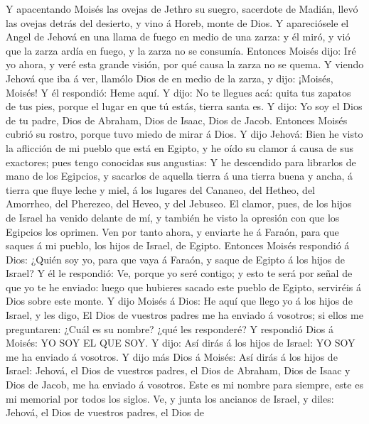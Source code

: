  Y apacentando Moisés las ovejas de Jethro su suegro,
sacerdote de Madián, llevó las ovejas detrás del desierto, y vino á
Horeb, monte de Dios.  Y apareciósele el Angel de Jehová
en una llama de fuego en medio de una zarza: y él miró, y vió que la
zarza ardía en fuego, y la zarza no se consumía.  Entonces
Moisés dijo: Iré yo ahora, y veré esta grande visión, por qué causa la
zarza no se quema.  Y viendo Jehová que iba á ver, llamólo
Dios de en medio de la zarza, y dijo: ¡Moisés, Moisés! Y él respondió:
Heme aquí.  Y dijo: No te llegues acá: quita tus zapatos
de tus pies, porque el lugar en que tú estás, tierra santa es.
 Y dijo: Yo soy el Dios de tu padre, Dios de Abraham, Dios
de Isaac, Dios de Jacob. Entonces Moisés cubrió su rostro, porque tuvo
miedo de mirar á Dios.  Y dijo Jehová: Bien he visto la
aflicción de mi pueblo que está en Egipto, y he oído su clamor á causa
de sus exactores; pues tengo conocidas sus angustias:  Y
he descendido para librarlos de mano de los Egipcios, y sacarlos de
aquella tierra á una tierra buena y ancha, á tierra que fluye leche y
miel, á los lugares del Cananeo, del Hetheo, del Amorrheo, del Pherezeo,
del Heveo, y del Jebuseo.  El clamor, pues, de los hijos
de Israel ha venido delante de mí, y también he visto la opresión con
que los Egipcios los oprimen.  Ven por tanto ahora, y
enviarte he á Faraón, para que saques á mi pueblo, los hijos de Israel,
de Egipto.  Entonces Moisés respondió á Dios: ¿Quién soy
yo, para que vaya á Faraón, y saque de Egipto á los hijos de Israel?
 Y él le respondió: Ve, porque yo seré contigo; y esto te
será por señal de que yo te he enviado: luego que hubieres sacado este
pueblo de Egipto, serviréis á Dios sobre este monte.  Y
dijo Moisés á Dios: He aquí que llego yo á los hijos de Israel, y les
digo, El Dios de vuestros padres me ha enviado á vosotros; si ellos me
preguntaren: ¿Cuál es su nombre? ¿qué les responderé?  Y
respondió Dios á Moisés: YO SOY EL QUE SOY. Y dijo: Así dirás á los
hijos de Israel: YO SOY me ha enviado á vosotros.  Y dijo
más Dios á Moisés: Así dirás á los hijos de Israel: Jehová, el Dios de
vuestros padres, el Dios de Abraham, Dios de Isaac y Dios de Jacob, me
ha enviado á vosotros. Este es mi nombre para siempre, este es mi
memorial por todos los siglos.  Ve, y junta los ancianos
de Israel, y diles: Jehová, el Dios de vuestros padres, el Dios de
